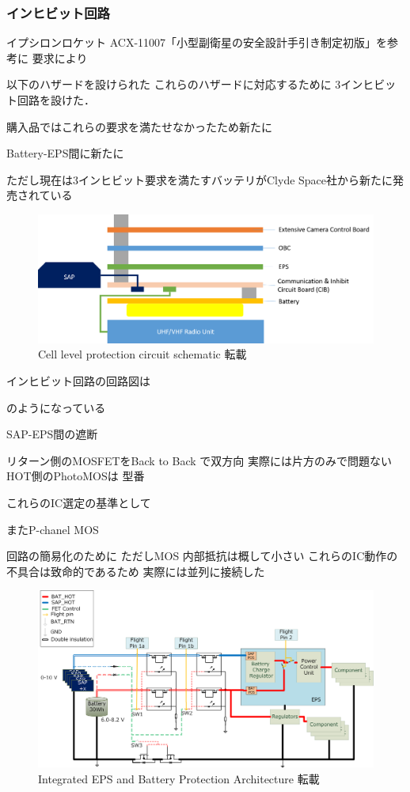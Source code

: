 \subsubsection{インヒビット回路}
イプシロンロケット
ACX-11007「小型副衛星の安全設計手引き制定初版」を参考に
要求により

以下のハザードを設けられた
これらのハザードに対応するために
3インヒビット回路を設けた．

購入品ではこれらの要求を満たせなかったため新たに

Battery-EPS間に新たに

ただし現在は3インヒビット要求を満たすバッテリがClyde Space社から新たに発売されている

\begin{figure}[htbp]
	\begin{center}
		\includegraphics[width=0.7\linewidth]{./03/fig/cib_position.png}
		\caption{Cell level protection circuit schematic 転載}
		\label{fig3_1_cibposi}
	\end{center}
\end{figure}
インヒビット回路の回路図は

のようになっている

SAP-EPS間の遮断


リターン側のMOSFETをBack to Back
で双方向
実際には片方のみで問題ない
HOT側のPhotoMOSは
型番


これらのIC選定の基準として

またP-chanel MOS

回路の簡易化のために
ただしMOS
内部抵抗は概して小さい
これらのIC動作の不具合は致命的であるため
実際には並列に接続した

\begin{figure}[htbp]
	\begin{center}
		\includegraphics[width=0.9\linewidth]{./03/fig/inhibit_diagram_2.png}
		\caption{Integrated EPS and Battery Protection Architecture 転載}
		\label{fig3_1_inhibit_d}
	\end{center}
\end{figure}

